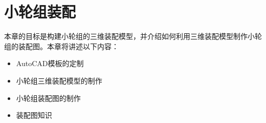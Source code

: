 \chapter{小轮组装配}

本章的目标是构建小轮组的三维装配模型，并介绍如何利用三维装配模型制作小轮组的装配图。本章将讲述以下内容：
\begin{itemize}
\item AutoCAD模板的定制
\item 小轮组三维装配模型的制作
\item 小轮组装配图的制作
\item 装配图知识
\end{itemize}


\endinput